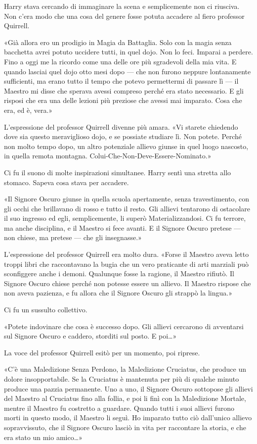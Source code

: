 Harry stava cercando di immaginare la scena e semplicemente non ci riusciva. Non c’era modo che una cosa del genere fosse potuta accadere al fiero professor Quirrell.

«Già allora ero un prodigio in Magia da Battaglia. Solo con la magia senza bacchetta avrei potuto uccidere tutti, in quel dojo. Non lo feci. Imparai a perdere. Fino a oggi me la ricordo come una delle ore più sgradevoli della mia vita. E quando lasciai quel dojo otto mesi dopo — che non furono neppure lontanamente sufficienti, ma erano tutto il tempo che potevo permettermi di passare lì — il Maestro mi disse che sperava avessi compreso perché era stato necessario. E gli risposi che era una delle lezioni più preziose che avessi mai imparato. Cosa che era, ed è, vera.»

L’espressione del professor Quirrell divenne più amara. «Vi starete chiedendo dove sia questo meraviglioso dojo, e se possiate studiare lì. Non potete. Perché non molto tempo dopo, un altro potenziale allievo giunse in quel luogo nascosto, in quella remota montagna. Colui-Che-Non-Deve-Essere-Nominato.»

Ci fu il suono di molte inspirazioni simultanee. Harry sentì una stretta allo stomaco. Sapeva cosa stava per accadere.

«Il Signore Oscuro giunse in quella scuola apertamente, senza travestimento, con gli occhi che brillavano di rosso e tutto il resto. Gli allievi tentarono di ostacolare il suo ingresso ed egli, semplicemente, li superò Materializzandosi. Ci fu terrore, ma anche disciplina, e il Maestro si fece avanti. E il Signore Oscuro pretese — non chiese, ma pretese — che gli insegnasse.»

L’espressione del professor Quirrell era molto dura. «Forse il Maestro aveva letto troppi libri che raccontavano la bugia che un vero praticante di arti marziali può sconfiggere anche i demoni. Qualunque fosse la ragione, il Maestro rifiutò. Il Signore Oscuro chiese perché non potesse essere un allievo. Il Maestro rispose che non aveva pazienza, e fu allora che il Signore Oscuro gli strappò la lingua.»

Ci fu un sussulto collettivo.

«Potete indovinare che cosa è successo dopo. Gli allievi cercarono di avventarsi sul Signore Oscuro e caddero, storditi sul posto. E poi…»

La voce del professor Quirrell esitò per un momento, poi riprese.

«C’è una Maledizione Senza Perdono, la Maledizione Cruciatus, che produce un dolore insopportabile. Se la Cruciatus è mantenuta per più di qualche minuto produce una pazzia permanente. Uno a uno, il Signore Oscuro sottopose gli allievi del Maestro al Cruciatus fino alla follia, e poi li finì con la Maledizione Mortale, mentre il Maestro fu costretto a guardare. Quando tutti i suoi allievi furono morti in questo modo, il Maestro li seguì. Ho imparato tutto ciò dall’unico allievo sopravvissuto, che il Signore Oscuro lasciò in vita per raccontare la storia, e che era stato un mio amico…»

